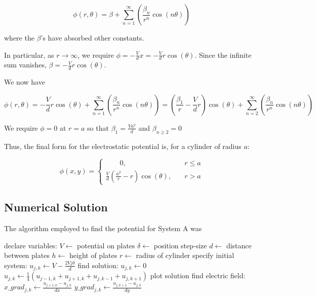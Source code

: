 \documentclass{article}
\newcommand{\be}{\begin{equation}}
\newcommand{\ee}{\end{equation}}
\begin{document}
\be
\phi(r,\theta)=\beta + \sum_{n=1}^{\infty}(\frac{\beta_n}{r^n} \cos(n\theta))
\ee

where the $\beta$'s have absorbed other constants.

In particular, as $r \rightarrow \infty$, we require
$\phi=-\frac{V}{d}x=-\frac{V}{d}r\cos(\theta)$. Since the infinite sum vanishes,
$\beta=-\frac{V}{d}r\cos(\theta)$.

We now have

\be
\phi(r,\theta)=-\frac{V}{d}r\cos(\theta) + \sum_{n=1}^{\infty}(\frac{\beta_n}{r^n} \cos(n\theta))
              =(\frac{\beta_1}{r}-\frac{V}{d}r)\cos(\theta) + \sum_{n=2}^{\infty}(\frac{\beta_n}{r^n} \cos(n\theta))
\ee

We require $\phi=0$ at $r=a$ so that $\beta_1=\frac{Va^2}{d}$ and $\beta_{n \geq 2}=0$

Thus, the final form for the electrostatic potential is, for a cylinder of radius $a$:

\be
\phi(x,y)=
\begin{cases} \qquad 0, & \quad r \leq a \\
\frac{V}{d}(\frac{a^2}{r}-r)\cos(\theta), & \quad r > a
\end{cases}
\ee

\subsection{Numerical Solution}

The algorithm employed to find the potential for System A was

\begin{algorithm}
\begin{algorithmic}[]
\State declare variables:
\State $V \gets$ potential on plates
\State $\delta \gets$ position step-size
\State $d \gets$ distance between plates
\State $h \gets$ height of plates
\State $r \gets$ radius of cylinder
\State specify initial system:
      \State $u_{j, k} \gets V-\frac{2Vj\delta}{d}$
   \EndFor
\EndFor
\State find solution:
         \State $u_{j, k} \gets 0$
      \Else
         \State $u_{j,k} \gets \frac{1}{4}(u_{j-1,k}+u_{j+1,k}+u_{j,k-1}+u_{j,k+1})$
      \EndIf
   \EndFor
\EndFor
\State plot solution
\State find electric field:
      \State $x\_grad_{j, k} \gets \frac{u_{j+1,k}-u_{j,k}}{dx}$
      \State $y\_grad_{j,k} \gets \frac{u_{j,k+1}-u_{j,k}}{dy}$
   \EndFor
\EndFor
\EndProcedure
\end{algorithmic}
\end{algorithm}
\end{document}
